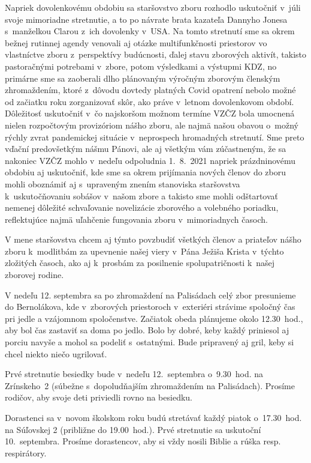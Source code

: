 Napriek dovolenkovému obdobiu sa staršovstvo zboru rozhodlo uskutočniť v~júli svoje mimoriadne stretnutie, a to po návrate brata kazateľa Dannyho Jonesa s~manželkou Clarou z~ich dovolenky v~USA. Na tomto stretnutí sme sa okrem bežnej rutinnej agendy venovali aj otázke multifunkčnosti priestorov vo vlastníctve zboru z~perspektívy budúcnosti, ďalej stavu zborových aktivít, takisto pastoračnými potrebami v~zbore, potom výsledkami a výstupmi KDZ, no primárne sme sa zaoberali dlho plánovaným výročným zborovým členským zhromaždením, ktoré z~dôvodu dovtedy platných Covid opatrení nebolo možné od začiatku roku zorganizovať skôr, ako práve v~letnom dovolenkovom období. Dôležitosť uskutočniť v~čo najskoršom možnom termíne VZČZ bola umocnená nielen rozpočtovým provizóriom nášho zboru, ale najmä našou obavou o~možný rýchly zvrat pandemickej situácie v~neprospech hromadných stretnutí. Sme preto vďační predovšetkým nášmu Pánovi, ale aj všetkým vám zúčastneným, že sa nakoniec VZČZ mohlo v~nedeľu odpoludnia 1.~8.~2021 napriek prázdninovému obdobiu aj uskutočniť, kde sme sa okrem prijímania nových členov do zboru mohli oboznámiť aj s~upraveným znením stanoviska staršovstva k~uskutočňovaniu sobášov v~našom zbore a takisto sme mohli odštartovať nemenej dôležité schvaľovanie novelizácie zborového a volebného poriadku, reflektujúce najmä uľahčenie fungovania zboru v~mimoriadnych časoch.

V mene staršovstva chcem aj týmto povzbudiť všetkých členov a priateľov nášho zboru k~modlitbám za upevnenie našej viery v~Pána Ježiša Krista v~týchto zložitých časoch, ako aj k~prosbám za posilnenie spolupatričnosti k~našej zborovej rodine.



V nedeľu 12. septembra sa po zhromaždení na Palisádach celý zbor presunieme do Bernolákova, kde v~zborových priestoroch v~exteriéri strávime spoločný čas pri jedle a vzájomnom spoločenstve. Začiatok obeda plánujeme okolo 12.30~hod., aby bol čas zastaviť sa doma po jedlo. Bolo by dobré, keby každý priniesol aj porciu navyše a mohol sa podeliť s~ostatnými. Bude pripravený aj gril, keby si chcel niekto niečo ugrilovať.
\vfill\break


Prvé stretnutie besiedky bude v~nedeľu 12.~septembra o~9.30~hod. na Zrínskeho~2 (súbežne s~dopoludňajším zhromaždením na Palisádach). Prosíme rodičov, aby svoje deti priviedli rovno na besiedku.

Dorastenci sa v~novom školskom roku budú stretávať každý piatok o~17.30~hod. na Súľovskej 2 (približne do 19.00~hod.). Prvé stretnutie sa uskutoční 10.~septembra. Prosíme dorastencov, aby si vždy nosili Biblie a rúška resp. respirátory.

